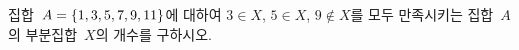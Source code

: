 집합~$A=\{1{,}\mkern3mu\mathopen{}3{,}\mkern3mu\mathopen{}5{,}\mkern3mu\mathopen{}7{,}\mkern3mu\mathopen{}9{,}\mkern3mu\mathopen{}11\}$에 대하여 $3\in X$, $5\in X$, $9\notin X$를 모두 만족시키는 집합~$A$의 부분집합~$X$의 개수를 \mbox{구하시오.}

